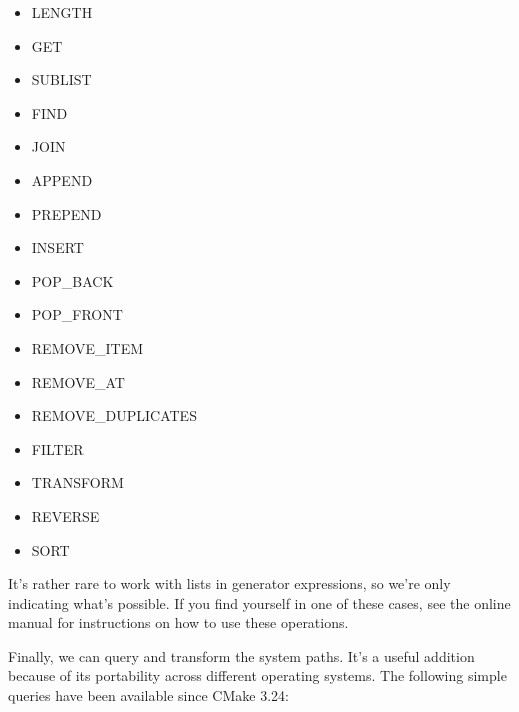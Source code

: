 \begin{itemize}
\item
LENGTH

\item
GET

\item
SUBLIST

\item
FIND

\item
JOIN

\item
APPEND

\item
PREPEND

\item
INSERT

\item
POP\_BACK

\item
POP\_FRONT

\item
REMOVE\_ITEM

\item
REMOVE\_AT

\item
REMOVE\_DUPLICATES

\item
FILTER

\item
TRANSFORM

\item
REVERSE

\item
SORT
\end{itemize}

It’s rather rare to work with lists in generator expressions, so we’re only indicating what’s possible. If you find yourself in one of these cases, see the online manual for instructions on how to use these operations.

Finally, we can query and transform the system paths. It’s a useful addition because of its portability across different operating systems. The following simple queries have been available since CMake 3.24:

